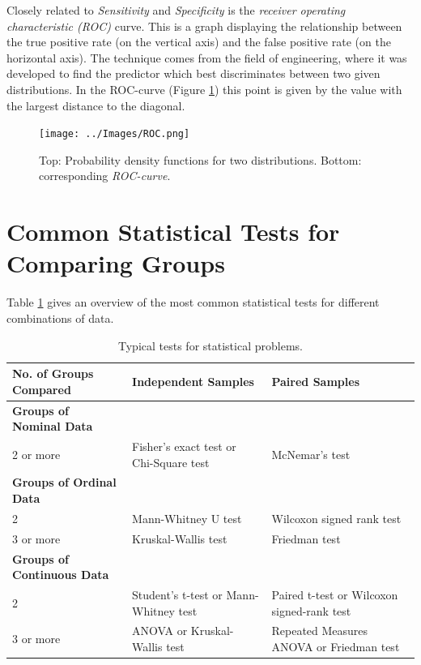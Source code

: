 Closely related to \emph{Sensitivity} and \emph{Specificity} is the \emph{receiver operating characteristic (ROC)} curve. This is a graph displaying the relationship between the true positive rate (on the vertical axis) and the false positive rate (on the horizontal axis). The technique comes from the field of engineering, where it was developed to find the predictor which best discriminates between two given distributions. In the ROC-curve (Figure \ref{fig:ROC}) this point is given by the value with the largest distance to the diagonal.

\begin{figure}[ht]
  \centering
  \texttt{[image: ../Images/ROC.png]}\\
  \caption{Top: Probability density functions for two distributions. Bottom: corresponding \emph{ROC-curve}.}\label{fig:ROC}
\end{figure}

\section{Common Statistical Tests for Comparing Groups}

Table \ref{table:tests} gives an overview of the most common statistical tests for different combinations of data.
\begin{table}
  \centering
  \footnotesize{
  \begin{tabular}{ | p{5cm} || p{5cm} | p{5cm} | }
     \hline
     No. of Groups Compared  & \textbf{Independent Samples} & \textbf{Paired Samples} \\ \hline
     \textbf{Groups of Nominal Data} & & \\ \hline
     2 or more & Fisher's exact test or Chi-Square test & McNemar's test \\ \hline
     \textbf{Groups of Ordinal Data} & & \\ \hline
     2 & Mann-Whitney U test & Wilcoxon signed rank test \\ \hline
     3 or more & Kruskal-Wallis test & Friedman test \\ \hline
     \textbf{Groups of Continuous Data} & & \\ \hline
     2 & Student's t-test or Mann-Whitney test & Paired t-test or Wilcoxon signed-rank test \\ \hline
     3 or more & ANOVA or Kruskal-Wallis test & Repeated Measures ANOVA or Friedman test \\ \hline

  \end{tabular}
  }

  \caption{Typical tests for statistical problems.}\label{table:tests}
\end{table}

